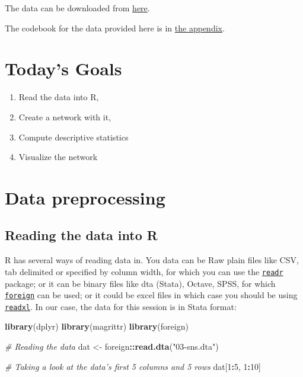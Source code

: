 \documentclass[]{book}
\newenvironment{Shaded}{\begin{snugshade}}{\end{snugshade}}
\newcommand{\KeywordTok}[1]{\textcolor[rgb]{0.13,0.29,0.53}{\textbf{#1}}}
\newcommand{\DecValTok}[1]{\textcolor[rgb]{0.00,0.00,0.81}{#1}}
\newcommand{\StringTok}[1]{\textcolor[rgb]{0.31,0.60,0.02}{#1}}
\newcommand{\CommentTok}[1]{\textcolor[rgb]{0.56,0.35,0.01}{\textit{#1}}}
\newcommand{\OperatorTok}[1]{\textcolor[rgb]{0.81,0.36,0.00}{\textbf{#1}}}
\newcommand{\NormalTok}[1]{#1}
\theoremstyle{definition}
\theoremstyle{definition}
\theoremstyle{definition}
\theoremstyle{remark}
\begin{document}
The data can be downloaded from
\href{https://gvegayon.github.io/appliedsnar/03-sns.dta}{here}.

The codebook for the data provided here is in
\protect\hyperlink{sns-data}{the appendix}.

\section{Today's Goals}\label{todays-goals}

\begin{enumerate}
\def\labelenumi{\arabic{enumi}.}
\item
  Read the data into R,
\item
  Create a network with it,
\item
  Compute descriptive statistics
\item
  Visualize the network
\end{enumerate}

\section{Data preprocessing}\label{data-preprocessing}

\subsection{Reading the data into R}\label{reading-the-data-into-r}

R has several ways of reading data in. You data can be Raw plain files
like CSV, tab delimited or specified by column width, for which you can
use the \href{https://cran.r-project.org/package=readr}{\texttt{readr}}
package; or it can be binary files like dta (Stata), Octave, SPSS, for
which \href{https://cran.r-project.org/package=readr}{\texttt{foreign}}
can be used; or it could be excel files in which case you should be
using \href{https://cran.r-project.org/package=readxl}{\texttt{readxl}}.
In our case, the data for this session is in Stata format:

\begin{Shaded}
\begin{Highlighting}[]
\KeywordTok{library}\NormalTok{(dplyr)}
\KeywordTok{library}\NormalTok{(magrittr)}
\KeywordTok{library}\NormalTok{(foreign)}

\CommentTok{# Reading the data}
\NormalTok{dat <-}\StringTok{ }\NormalTok{foreign}\OperatorTok{::}\KeywordTok{read.dta}\NormalTok{(}\StringTok{"03-sns.dta"}\NormalTok{)}

\CommentTok{# Taking a look at the data's first 5 columns and 5 rows}
\NormalTok{dat[}\DecValTok{1}\OperatorTok{:}\DecValTok{5}\NormalTok{, }\DecValTok{1}\OperatorTok{:}\DecValTok{10}\NormalTok{]}
\end{Highlighting}
\end{Shaded}
\end{document}
